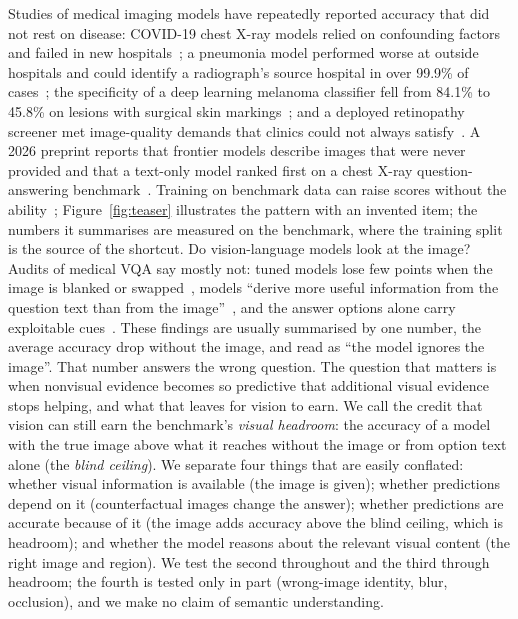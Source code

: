 Studies of medical imaging models have repeatedly reported accuracy that did not rest on disease: COVID-19 chest X-ray models relied on confounding factors and failed in new hospitals~\cite{degrave2021shortcuts}; a pneumonia model performed worse at outside hospitals and could identify a radiograph's source hospital in over 99.9\% of cases~\cite{zech2018variable}; the specificity of a deep learning melanoma classifier fell from 84.1\% to 45.8\% on lesions with surgical skin markings~\cite{winkler2019markings}; and a deployed retinopathy screener met image-quality demands that clinics could not always satisfy~\cite{beede2020humancentered}.
A 2026 preprint reports that frontier models describe images that were never provided and that a text-only model ranked first on a chest X-ray question-answering benchmark~\cite{asadi2026mirage}.
Training on benchmark data can raise scores without the ability~\cite{zhou2023cheater,zhang2024gsm1k}; Figure~\ref{fig:teaser} illustrates the pattern with an invented item; the numbers it summarises are measured on the benchmark, where the training split is the source of the shortcut.
Do vision-language models look at the image?
Audits of medical VQA say mostly not: tuned models lose few points when the image is blanked or swapped~\cite{zafar2026coral}, models ``derive more useful information from the question text than from the image''~\cite{pokrywka2026polish}, and the answer options alone carry exploitable cues~\cite{wang2026medqamm}.
These findings are usually summarised by one number, the average accuracy drop without the image, and read as ``the model ignores the image''.
That number answers the wrong question.
The question that matters is when nonvisual evidence becomes so predictive that additional visual evidence stops helping, and what that leaves for vision to earn.
We call the credit that vision can still earn the benchmark's \emph{visual headroom}: the accuracy of a model with the true image above what it reaches without the image or from option text alone (the \emph{blind ceiling}).
We separate four things that are easily conflated: whether visual information is available (the image is given); whether predictions depend on it (counterfactual images change the answer); whether predictions are accurate because of it (the image adds accuracy above the blind ceiling, which is headroom); and whether the model reasons about the relevant visual content (the right image and region). We test the second throughout and the third through headroom; the fourth is tested only in part (wrong-image identity, blur, occlusion), and we make no claim of semantic understanding.

